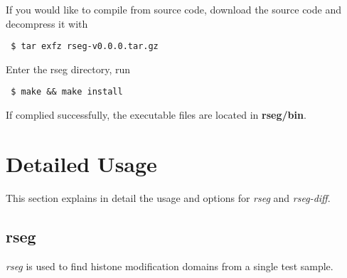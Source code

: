 \documentclass[11pt]{report}
\begin{document}
If you would like to compile from source code, download the source
code and decompress it with
\begin{verbatim}
 $ tar exfz rseg-v0.0.0.tar.gz
\end{verbatim}
%
Enter the rseg directory, run
\begin{verbatim}
 $ make && make install
\end{verbatim}
If complied successfully, the executable files are located in \textbf{rseg/bin}.

\section{Detailed Usage}
\label{sec:usage-detail}

This section explains in detail the usage and options for
\textit{rseg} and \textit{rseg-diff}.

\subsection{rseg}
\label{sec:rseg-detail}

\textit{rseg} is used to find histone modification domains from a
single test sample. 
\end{document}
